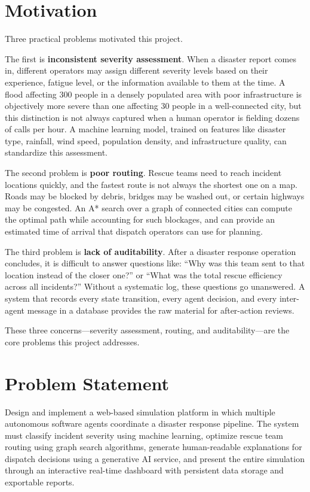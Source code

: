 \section{Motivation}
\label{sec:motivation}

Three practical problems motivated this project.

The first is \textbf{inconsistent severity assessment}. When a disaster report comes in, different operators may assign different severity levels based on their experience, fatigue level, or the information available to them at the time. A flood affecting 300 people in a densely populated area with poor infrastructure is objectively more severe than one affecting 30 people in a well-connected city, but this distinction is not always captured when a human operator is fielding dozens of calls per hour. A machine learning model, trained on features like disaster type, rainfall, wind speed, population density, and infrastructure quality, can standardize this assessment.

The second problem is \textbf{poor routing}. Rescue teams need to reach incident locations quickly, and the fastest route is not always the shortest one on a map. Roads may be blocked by debris, bridges may be washed out, or certain highways may be congested. An A* search over a graph of connected cities can compute the optimal path while accounting for such blockages, and can provide an estimated time of arrival that dispatch operators can use for planning.

The third problem is \textbf{lack of auditability}. After a disaster response operation concludes, it is difficult to answer questions like: ``Why was this team sent to that location instead of the closer one?'' or ``What was the total rescue efficiency across all incidents?'' Without a systematic log, these questions go unanswered. A system that records every state transition, every agent decision, and every inter-agent message in a database provides the raw material for after-action reviews.

These three concerns---severity assessment, routing, and auditability---are the core problems this project addresses.

\section{Problem Statement}
\label{sec:problem_statement}

Design and implement a web-based simulation platform in which multiple autonomous software agents coordinate a disaster response pipeline. The system must classify incident severity using machine learning, optimize rescue team routing using graph search algorithms, generate human-readable explanations for dispatch decisions using a generative AI service, and present the entire simulation through an interactive real-time dashboard with persistent data storage and exportable reports.

